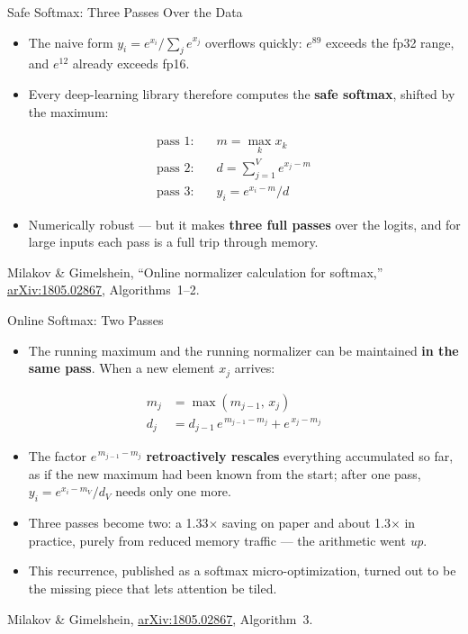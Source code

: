 \begin{frame}{Safe Softmax: Three Passes Over the Data}
    \begin{itemize}\itemsep0.4em
        \item The naive form $y_i = e^{x_i} / \sum_j e^{x_j}$ overflows quickly: $e^{89}$ exceeds the fp32 range, and $e^{12}$ already exceeds fp16.
        \item Every deep-learning library therefore computes the \textbf{safe softmax}, shifted by the maximum:
    \end{itemize}
    \begin{align*}
        \text{pass 1:}\quad & m = \max_k x_k \\
        \text{pass 2:}\quad & d = \textstyle\sum_{j=1}^{V} e^{x_j - m} \\
        \text{pass 3:}\quad & y_i = e^{x_i - m} / d
    \end{align*}
    \begin{itemize}\itemsep0.4em
        \item Numerically robust --- but it makes \textbf{three full passes} over the logits, and for large inputs each pass is a full trip through memory.
    \end{itemize}
    \vspace{0.3em}
    {\scriptsize Milakov \& Gimelshein, ``Online normalizer calculation for softmax,'' \href{https://arxiv.org/abs/1805.02867}{arXiv:1805.02867}, Algorithms~1--2.}
\end{frame}

\begin{frame}{Online Softmax: Two Passes}
    \begin{itemize}\itemsep0.4em
        \item The running maximum and the running normalizer can be maintained \textbf{in the same pass}. When a new element $x_j$ arrives:
    \end{itemize}
    \begin{align*}
        m_j &= \max(m_{j-1},\, x_j) \\
        d_j &= d_{j-1}\, e^{\,m_{j-1} - m_j} + e^{\,x_j - m_j}
    \end{align*}
    \begin{itemize}\itemsep0.4em
        \item The factor $e^{\,m_{j-1} - m_j}$ \textbf{retroactively rescales} everything accumulated so far, as if the new maximum had been known from the start; after one pass, $y_i = e^{x_i - m_V} / d_V$ needs only one more.
        \item Three passes become two: a 1.33$\times$ saving on paper and about 1.3$\times$ in practice, purely from reduced memory traffic --- the arithmetic went \emph{up}.
        \item This recurrence, published as a softmax micro-optimization, turned out to be the missing piece that lets attention be tiled.
    \end{itemize}
    \vspace{0.3em}
    {\scriptsize Milakov \& Gimelshein, \href{https://arxiv.org/abs/1805.02867}{arXiv:1805.02867}, Algorithm~3.}
\end{frame}

